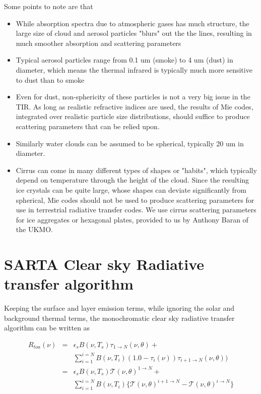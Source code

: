 \documentclass[11pt]{article}
\begin{document}
Some points to note are that
\begin{itemize}
  \item While absorption spectra due to atmospheric gases has much structure, the large
        size of cloud and aerosol particles "blurs" out the the lines, resulting 
        in much smoother absorption and scattering parameters
  \item Typical aerosol particles range from 0.1 um (smoke) to 4 um (dust) in diameter, which means 
        the thermal infrared is typically much more sensitive to dust than to smoke
  \item Even for dust, non-sphericity of these particles is not a very big issue in the TIR.
        As long as realistic refractive indices are used, the results of Mie codes, integrated over 
        realistic particle size distributions, should suffice to produce scattering parameters that can be
        relied upon.
  \item Similarly water clouds can be assumed to be spherical, typically 20 um in diameter.
  \item Cirrus can come in many different types of shapes or "habits", which typically
        depend on temperature through the height of the cloud. Since the resulting ice 
        crystals can be quite large, whose shapes can deviate significantly from spherical, Mie codes should
        not be used to produce scattering parameters for use in terrestrial radiative transfer codes. 
        We use cirrus scattering parameters for ice aggregates or hexagonal plates, provided to us by
        Anthony Baran of the UKMO.
\end{itemize}

\section{SARTA Clear sky Radiative transfer algorithm}

Keeping the surface and layer emission terms, while ignoring the solar and background thermal terms, 
the monochromatic clear sky radiative transfer algorithm can be written as

\begin{eqnarray*}
R_{toa}(\nu) & = & \epsilon_{s} B(\nu,T_{s}) \tau_{1 \rightarrow N}(\nu,\theta) + \\
             &   &  \sum_{i=1}^{i=N} B(\nu,T_{i})
                   (1.0 - \tau_{i}(\nu)) \tau_{i+1 \rightarrow N}(\nu,\theta)) \\
             & = & \epsilon_{s} B(\nu,T_{s}) \mathcal{T}(\nu,\theta)^{1 \rightarrow N} + \\
             &   &  \sum_{i=1}^{i=N} B(\nu,T_{i}) \{ \mathcal{T}(\nu,\theta)^{i+1\rightarrow N} - 
                                                     \mathcal{T}(\nu,\theta)^{i \rightarrow N} \}
\end{eqnarray*}
\end{document}
